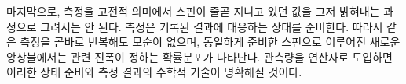 \begin{classroomqa}
\end{classroomqa}

마지막으로, 측정을 고전적 의미에서 스핀이 줄곧 지니고 있던 값을 그저 밝혀내는 과정으로 그려서는 안 된다. 측정은 기록된 결과에 대응하는 상태를 준비한다. 따라서 같은 측정을 곧바로 반복해도 모순이 없으며, 동일하게 준비한 스핀으로 이루어진 새로운 앙상블에서는 관련 진폭이 정하는 확률분포가 나타난다. 관측량을 연산자로 도입하면 이러한 상태 준비와 측정 결과의 수학적 기술이 명확해질 것이다.